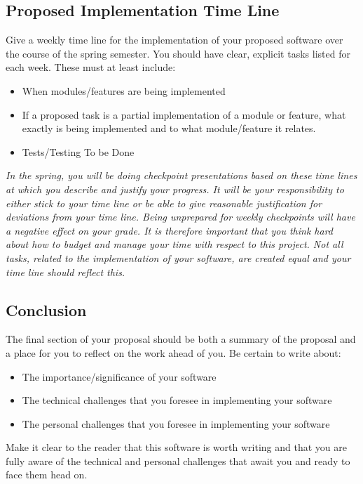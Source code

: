 \documentclass[10pt]{article}
\begin{document}
\subsection{Proposed Implementation Time Line}

Give a weekly time line for the implementation of your proposed software over the course of the spring semester.  You should have clear, explicit tasks listed for each week.  These must at least include:
\begin{itemize}
\item When modules/features are being implemented
\item If a proposed task is a partial implementation of a module or feature, what exactly is being implemented and to what module/feature it relates.
\item Tests/Testing To be Done
\end{itemize}
\textit{In the spring, you will be doing checkpoint presentations based on these time lines at which you describe and justify your progress.  It will be your responsibility to either stick to your time line or be able to give reasonable justification for deviations from your time line.  Being unprepared for weekly checkpoints will have a negative effect on your grade.  It is therefore important that you think hard about how to budget and manage your time with respect to this project.  Not all tasks, related to the implementation of your software, are created equal and your time line should reflect this.   }

\subsection{Conclusion}

The final section of your proposal should be both a summary of the proposal and a place for you to reflect on the work ahead of you.  Be certain to write about:
\begin{itemize}
\item The importance/significance of your software
\item The technical challenges that you foresee in implementing your software
\item The personal challenges that you foresee in implementing your software
\end{itemize}
Make it clear to the reader that this software is worth writing and that you are fully aware of the technical and personal challenges that await you and ready to face them head on.
\end{document}
